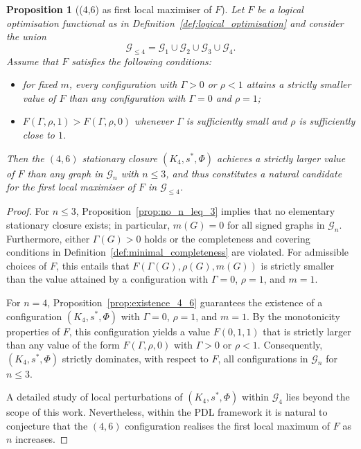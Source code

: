 \documentclass[11pt,a4paper]{article}
\newtheorem{proposition}[theorem]{Proposition}
\theoremstyle{definition}
\begin{document}
\begin{proposition}[(4,6) as first local maximiser of $F$]
\label{prop:4_6_local_max}
Let $F$ be a logical optimisation functional as in Definition~\ref{def:logical_optimisation} and consider the union
\[
 \mathcal{G}_{\leq 4} = \mathcal{G}_1 \cup \mathcal{G}_2 \cup \mathcal{G}_3 \cup \mathcal{G}_4.
\]
Assume that $F$ satisfies the following conditions:
\begin{itemize}
  \item for fixed $m$, every configuration with $\Gamma>0$ or $\rho<1$ attains a strictly smaller value of $F$ than any configuration with $\Gamma=0$ and $\rho=1$;
  \item $F(\Gamma,\rho,1) > F(\Gamma,\rho,0)$ whenever $\Gamma$ is sufficiently small and $\rho$ is sufficiently close to $1$.
\end{itemize}
Then the $(4,6)$ stationary closure $(K_4,s^\ast,\Phi)$ achieves a strictly larger value of $F$ than any graph in $\mathcal{G}_n$ with $n\leq 3$, and thus constitutes a natural candidate for the first local maximiser of $F$ in $\mathcal{G}_{\leq 4}$.
\end{proposition}

\begin{proof}
For $n \leq 3$, Proposition~\ref{prop:no_n_leq_3} implies that no elementary stationary closure exists; in particular, $m(G)=0$ for all signed graphs in $\mathcal{G}_n$.\cite{PDL_Main_2026} Furthermore, either $\Gamma(G)>0$ holds or the completeness and covering conditions in Definition~\ref{def:minimal_completeness} are violated. For admissible choices of $F$, this entails that $F(\Gamma(G),\rho(G),m(G))$ is strictly smaller than the value attained by a configuration with $\Gamma=0$, $\rho=1$, and $m=1$.

For $n=4$, Proposition~\ref{prop:existence_4_6} guarantees the existence of a configuration $(K_4,s^\ast,\Phi)$ with $\Gamma=0$, $\rho=1$, and $m=1$. By the monotonicity properties of $F$, this configuration yields a value $F(0,1,1)$ that is strictly larger than any value of the form $F(\Gamma,\rho,0)$ with $\Gamma>0$ or $\rho<1$. Consequently, $(K_4,s^\ast,\Phi)$ strictly dominates, with respect to $F$, all configurations in $\mathcal{G}_n$ for $n \leq 3$.

A detailed study of local perturbations of $(K_4,s^\ast,\Phi)$ within $\mathcal{G}_4$ lies beyond the scope of this work. Nevertheless, within the PDL framework it is natural to conjecture that the $(4,6)$ configuration realises the first local maximum of $F$ as $n$ increases.\cite{PDL_Main_2026,PDL_Global_Mapping_2026}
\end{proof}
\end{document}
